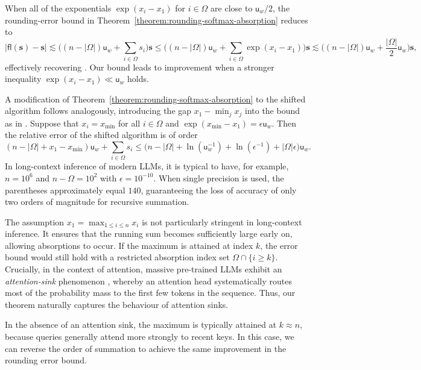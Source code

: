 \documentclass[namedate,webpdf,imanum]{ima-authoring-template}
\newcommand{\Matrix}[1]{\mathbf{#1}}
\newcommand{\fl}[2][]{\mathsf{fl}#1( #2 #1)}
\newcommand{\uh}{\mathsf{u}}
\numberwithin{equation}{section}
\begin{document}
When all of the exponentials $\exp(x_i - x_1)$ for $i \in \Omega$ are close to $\uh_w / 2$, the rounding-error bound in Theorem~\ref{theorem:rounding-softmax-absorption} reduces to
\begin{equation*}
    |\fl{\Matrix{s}} - \Matrix{s}| \lesssim \Big( (n - |\Omega|) \uh_w + \sum_{i \in \Omega} s_i \Big) \Matrix{s} \leq \Big( (n - |\Omega|) \uh_w + \sum_{i \in \Omega} \exp(x_i - x_1) \Big) \Matrix{s} \lesssim \Big( (n - |\Omega|) \uh_w + \frac{|\Omega|}{2} \uh_w \Big) \Matrix{s},
\end{equation*}
effectively recovering \cite[Theorem~3.4]{blanchard2021accurately}.
Our bound leads to improvement when a stronger inequality $\exp(x_i - x_1) \ll \uh_w$ holds.

A modification of Theorem~\ref{theorem:rounding-softmax-absorption} to the shifted algorithm follows analogously, introducing the gap $x_1 - \min_j x_j$ into the bound as in \cite[Theorem~4.3]{blanchard2021accurately}.
Suppose that $x_i = x_{\min}$ for all $i \in \Omega$ and $\exp(x_{\min} - x_1) = \epsilon \uh_w$.
Then the relative error of the shifted algorithm is of order
\begin{equation*}
    (n - |\Omega| + x_1 - x_{\min}) \uh_w + \sum_{i \in \Omega} s_i \leq \Big(n - |\Omega| + \ln(\uh_w^{-1}) + \ln(\epsilon^{-1}) + |\Omega| \epsilon \Big) \uh_w.
\end{equation*}
In long-context inference of modern LLMs, it is typical to have, for example, $n = 10^6$ and $n - \Omega = 10^2$ with $\epsilon = 10^{-10}$.
When single precision is used, the parentheses approximately equal $140$, guaranteeing the loss of accuracy of only two orders of magnitude for recursive summation.

The assumption $x_1 = \max_{1 \leq i \leq n} x_i$ is not particularly stringent in long-context inference.
It ensures that the running sum becomes sufficiently large early on, allowing absorptions to occur.
If the maximum is attained at index $k$, the error bound would still hold with a restricted absorption index set $\Omega \cap \{ i \geq k \}$.
Crucially, in the context of attention, massive pre-trained LLMs exhibit an \emph{attention-sink} phenomenon \citep{xiao2024efficient}, whereby an attention head systematically routes most of the probability mass to the first few tokens in the sequence.
Thus, our theorem naturally captures the behaviour of attention sinks.

In the absence of an attention sink, the maximum is typically attained at $k \approx n$, because queries generally attend more strongly to recent keys.
In this case, we can reverse the order of summation to achieve the same improvement in the rounding error bound.
\end{document}
